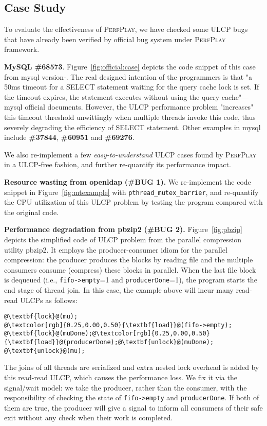 \subsection{Case Study}
\label{sec:case:study}
To evaluate the effectiveness of \textsc{PerfPlay}, we have checked some ULCP bugs that have already been verified by official bug system under \textsc{PerfPlay} framework.

{\bf MySQL \#68573}. Figure~\ref{fig:official:case} depicts the code snippet of this case from \textsf{mysql} version-. The real designed intention of the programmers is that "a 50ms timeout for a SELECT statement waiting for the query cache lock is set. If the timeout expires, the statement executes without using the query cache"---\textsf{mysql} official documents. However, the ULCP performance problem "increases" this timeout threshold unwittingly when multiple threads invoke this code, thus severely degrading the efficiency of SELECT statement. Other examples in \textsf{mysql} include \textbf{\#37844}, \textbf{\#60951} and \textbf{\#69276}.

We also re-implement a few \emph{easy-to-understand} ULCP cases found by \textsc{PerfPlay} in a ULCP-free fashion, and further re-quantify its performance impact.

\textbf{Resource wasting from openldap} {\bf (\#BUG 1).} We re-implement the code snippet in Figure~\ref{fig:mtexample} with \texttt{pthread\_mutex\_barrier}, and re-quantify the CPU utilization of this ULCP problem by testing the program compared with the original code. 

\textbf{Performance degradation from pbzip2} {\bf (\#BUG 2).} Figure~\ref{fig:pbzip} depicts the simplified code of ULCP problem from the parallel compression utility pbzip2. It employs the producer-consumer idiom for the parallel compression: the producer produces the blocks by reading file and the multiple consumers consume (compress) these blocks in parallel. When the last file block is dequeued (i.e., \texttt{fifo->empty}=1 and \texttt{producerDone}=1), the program starts the end stage of thread join. In this case, the example above will incur many read-read ULCPs as follows:
\begin{lstlisting}[escapechar=@]
@\textbf{lock}@(mu);
@\textcolor[rgb]{0.25,0.00,0.50}{\textbf{load}}@(fifo->empty);
@\textbf{lock}@(muDone);@\textcolor[rgb]{0.25,0.00,0.50}{\textbf{load}}@(producerDone);@\textbf{unlock}@(muDone);
@\textbf{unlock}@(mu);
\end{lstlisting}
The joins of all threads are serialized and extra nested lock overhead is added by this read-read ULCP, which causes the performance loss. We fix it via the signal/wait model: we take the producer, rather than the consumer, with the responsibility of checking the state of \texttt{fifo->empty} and \texttt{producerDone}. If both of them are \textsf{true}, the producer will give a signal to inform all consumers of their safe exit without any check when their work is completed.

